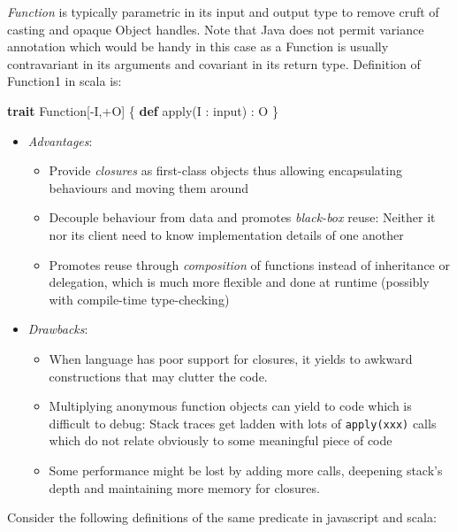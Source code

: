 \documentclass[11pt,]{article}
\newenvironment{Shaded}{}{}
\newcommand{\KeywordTok}[1]{\textcolor[rgb]{0.00,0.44,0.13}{\textbf{{#1}}}}
\newcommand{\FunctionTok}[1]{\textcolor[rgb]{0.02,0.16,0.49}{{#1}}}
\newcommand{\NormalTok}[1]{{#1}}
\begin{document}
\emph{Function} is typically parametric in its input and output type to
remove cruft of casting and opaque Object handles. Note that Java does
not permit variance annotation which would be handy in this case as a
Function is usually contravariant in its arguments and covariant in its
return type. Definition of Function1 in scala is:

\begin{Shaded}
\begin{Highlighting}[]
\KeywordTok{trait} \NormalTok{Function[-I,+O] \{ }\KeywordTok{def} \FunctionTok{apply}\NormalTok{(I : input) : O \}}
\end{Highlighting}
\end{Shaded}

\begin{itemize}
\item
  \emph{Advantages}:

  \begin{itemize}
  \item
    Provide \emph{closures} as first-class objects thus allowing
    encapsulating behaviours and moving them around
  \item
    Decouple behaviour from data and promotes \emph{black-box} reuse:
    Neither it nor its client need to know implementation details of one
    another
  \item
    Promotes reuse through \emph{composition} of functions instead of
    inheritance or delegation, which is much more flexible and done at
    runtime (possibly with compile-time type-checking)
  \end{itemize}
\item
  \emph{Drawbacks}:

  \begin{itemize}
  \item
    When language has poor support for closures, it yields to awkward
    constructions that may clutter the code.
  \item
    Multiplying anonymous function objects can yield to code which is
    difficult to debug: Stack traces get ladden with lots of
    \texttt{apply(xxx)} calls which do not relate obviously to some
    meaningful piece of code
  \item
    Some performance might be lost by adding more calls, deepening
    stack's depth and maintaining more memory for closures.
  \end{itemize}
\end{itemize}

Consider the following definitions of the same predicate in javascript
and scala:
\end{document}
